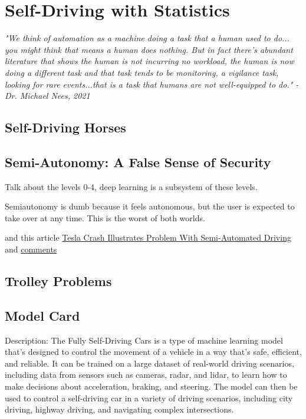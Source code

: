 \setchapterpreamble[u]{\margintoc}
\chapter{Self-Driving with Statistics}

\textit{"We think of automation as a machine doing a task that a human used to do... you might think that means a human does nothing. But in fact there’s abundant literature that shows the human is not incurring no workload, the human is now doing a different task and that task tends to be monitoring, a vigilance task, looking for rare events...that is a task that humans are not well-equipped to do." - Dr. Michael Nees, 2021}\cite{nees2021}

\section{Self-Driving Horses}

\section{Semi-Autonomy: A False Sense of Security}

Talk about the levels 0-4, deep learning is a subsystem of these levels.

Semiautonomy is dumb because it feels autonomous, but the user is expected to take over at any time. This is the worst of both worlds. \cite{torchinsky_boeckmann_2019}

and this article \href{https://www.theautopian.com/newly-released-video-of-thanksgiving-day-tesla-full-self-driving-crash-demonstrates-the-fundamental-problem-of-semi-automated-driving-systems/}{Tesla Crash Illustrates Problem With Semi-Automated Driving} and \href{https://news.ycombinator.com/item?id=34347778}{comments}

\section{Trolley Problems}

\section{Model Card}

Description:
The Fully Self-Driving Cars is a type of machine learning model that's designed to control the movement of a vehicle in a way that's safe, efficient, and reliable. It can be trained on a large dataset of real-world driving scenarios, including data from sensors such as cameras, radar, and lidar, to learn how to make decisions about acceleration, braking, and steering. The model can then be used to control a self-driving car in a variety of driving scenarios, including city driving, highway driving, and navigating complex intersections.


